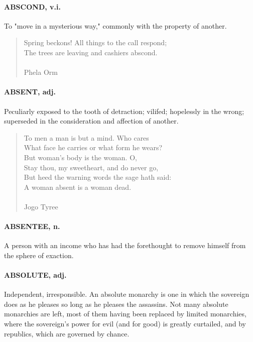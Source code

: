 \documentclass[11pt]{article}
\begin{document}
\paragraph{ABSCOND, v.i.}  To "move in a mysterious way," commonly with the
property of another.

\begin{quote}   Spring beckons!  All things to the call respond; \\
  The trees are leaving and cashiers abscond. \\
 \\
Phela Orm \end{quote}


\paragraph{ABSENT, adj.}  Peculiarly exposed to the tooth of detraction; vilifed;
hopelessly in the wrong; superseded in the consideration and affection
of another.

\begin{quote}   To men a man is but a mind.  Who cares \\
  What face he carries or what form he wears? \\
  But woman's body is the woman.  O, \\
  Stay thou, my sweetheart, and do never go, \\
  But heed the warning words the sage hath said: \\
  A woman absent is a woman dead. \\
 \\
Jogo Tyree \end{quote}


\paragraph{ABSENTEE, n.}  A person with an income who has had the forethought to
remove himself from the sphere of exaction.

\paragraph{ABSOLUTE, adj.}  Independent, irresponsible.  An absolute monarchy is
one in which the sovereign does as he pleases so long as he pleases
the assassins.  Not many absolute monarchies are left, most of them
having been replaced by limited monarchies, where the sovereign's
power for evil (and for good) is greatly curtailed, and by republics,
which are governed by chance.
\end{document}
